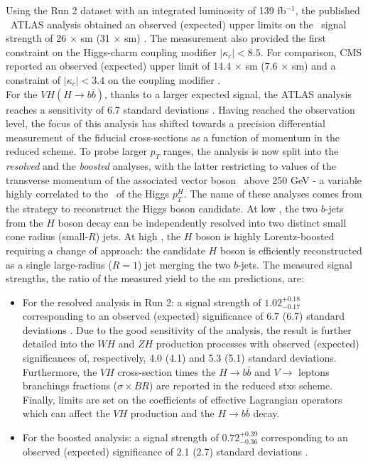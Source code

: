 Using the Run 2 dataset with an integrated luminosity of 139 fb$^{-1}$, the published \vhc\ ATLAS analysis obtained an observed (expected) upper limits on the \vhc\ signal strength of 26 $\times$ \gls{sm} (31 $\times$ \gls{sm}) \cite{Collaboration:2721696}. The measurement also provided the first constraint on the Higgs-charm coupling modifier $|\kappa_c| < 8.5$. For comparison, CMS reported an observed (expected) upper limit of 14.4 $\times$ \gls{sm} (7.6 $\times$ \gls{sm}) and a constraint of $|\kappa_c| < 3.4 $ on the coupling modifier \cite{arXiv:2205.05550}. \\ 

For the $VH (H\rightarrow b\bar{b})$, thanks to a larger expected signal, the ATLAS analysis reaches a sensitivity of 6.7 standard deviations \cite{ATLAS:2020fcp}. Having reached the observation level, the focus of this analysis has shifted towards a precision differential measurement of the fiducial cross-sections as a function of momentum in the reduced  scheme. To probe larger $p_T$ ranges, the analysis is now split into the \textit{resolved} \cite{ATLAS:2020fcp} and the \textit{boosted} \cite{ATLAS:2020jwz} analyses, with the latter restricting to values of the transverse momentum of the associated vector boson \ptv\ above 250 GeV - a variable highly correlated to the \pt\ of the Higgs $p_T^H$. The name of these analyses comes from the strategy to reconstruct the Higgs boson candidate. At low \ptv, the two $b$-jets from the $H$ boson decay can be independently resolved into two distinct small cone radius (small-$R$) jets. At high \ptv, the $H$ boson is highly Lorentz-boosted requiring a change of approach: the candidate $H$ boson is efficiently reconstructed as a single large-radius ($R = 1$) jet merging the two $b$-jets. The measured signal strengths, the ratio of the measured yield to the \gls{sm} predictions, are: 
\begin{itemize}
\item For the resolved analysis in Run 2: a signal strength of $1.02_{-0.17}^{+0.18}$ corresponding to an observed (expected) significance of 6.7 (6.7) standard deviations \cite{ATLAS:2020fcp}. Due to the good sensitivity of the analysis, the result is further detailed into the $WH$ and $ZH$ production processes with observed (expected) significances of, respectively, 4.0 (4.1) and 5.3 (5.1) standard deviations. Furthermore, the $VH$ cross-section times the $H \rightarrow b\bar{b}$ and $V\rightarrow$ leptons branchings fractions ($\sigma \times BR$) are reported in the reduced \gls{stxs} scheme. Finally, limits are set on the coefficients of effective Lagrangian operators which can affect the $VH$ production and the $H \rightarrow b\bar{b}$ decay.
\item For the boosted analysis: a signal strength of  $0.72_{-0.36}^{+0.39}$ corresponding to an observed (expected) significance of 2.1 (2.7) standard deviations \cite{ATLAS:2020jwz}.
\end{itemize}

